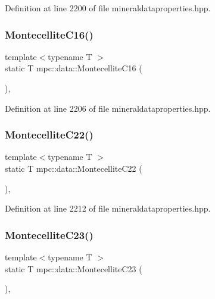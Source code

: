 Definition at line 2200 of file mineraldataproperties.\+hpp.

\mbox{\label{namespacempc_1_1data_acab0caa06748c8a1af345753adfd25d1}} 
\subsubsection{\texorpdfstring{Montecellite\+C16()}{MontecelliteC16()}}
{\footnotesize\ttfamily template$<$typename T $>$ \\
static T mpc\+::data\+::\+Montecellite\+C16 (\begin{DoxyParamCaption}{ }\end{DoxyParamCaption})\hspace{0.3cm}{\ttfamily [inline]}, {\ttfamily [static]}}



Definition at line 2206 of file mineraldataproperties.\+hpp.

\mbox{\label{namespacempc_1_1data_ae6e86895e32b60d682c15d0cf5643f4d}} 
\subsubsection{\texorpdfstring{Montecellite\+C22()}{MontecelliteC22()}}
{\footnotesize\ttfamily template$<$typename T $>$ \\
static T mpc\+::data\+::\+Montecellite\+C22 (\begin{DoxyParamCaption}{ }\end{DoxyParamCaption})\hspace{0.3cm}{\ttfamily [inline]}, {\ttfamily [static]}}



Definition at line 2212 of file mineraldataproperties.\+hpp.

\mbox{\label{namespacempc_1_1data_ab83633eb58c6e8449c218fef7cfedf0d}} 
\subsubsection{\texorpdfstring{Montecellite\+C23()}{MontecelliteC23()}}
{\footnotesize\ttfamily template$<$typename T $>$ \\
static T mpc\+::data\+::\+Montecellite\+C23 (\begin{DoxyParamCaption}{ }\end{DoxyParamCaption})\hspace{0.3cm}{\ttfamily [inline]}, {\ttfamily [static]}}



